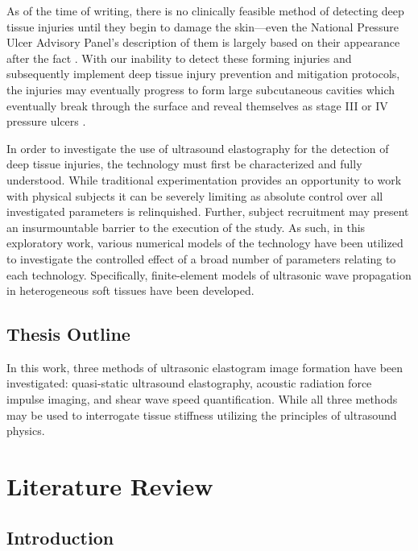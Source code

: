 \documentclass[12pt]{book}
\begin{document}
		As of the time of writing, there is no clinically feasible method of detecting deep tissue injuries until they begin to damage the skin---even the National Pressure Ulcer Advisory Panel's description of them is largely based on their appearance after the fact \cite{npuap07}. With our inability to detect these forming injuries and subsequently implement deep tissue injury prevention and mitigation protocols, the injuries may eventually progress to form large subcutaneous cavities which eventually break through the surface and reveal themselves as stage III or IV pressure ulcers \cite{bouten03,oomens10}. 

		In order to investigate the use of ultrasound elastography for the detection of deep tissue injuries, the technology must first be characterized and fully understood. While traditional experimentation provides an opportunity to work with physical subjects it can be severely limiting as absolute control over all investigated parameters is relinquished. Further, subject recruitment may present an insurmountable barrier to the execution of the study. As such, in this exploratory work, various numerical models of the technology have been utilized to investigate the controlled effect of a broad number of parameters relating to each technology. Specifically, finite-element models of ultrasonic wave propagation in heterogeneous soft tissues have been developed. 

	\section{Thesis Outline}
		In this work, three methods of ultrasonic elastogram image formation have been investigated: quasi-static ultrasound elastography, acoustic radiation force impulse imaging, and shear wave speed quantification. While all three methods may be used to interrogate tissue stiffness utilizing the principles of ultrasound physics.

\chapter{Literature Review}
	\section{Introduction}
\end{document}
